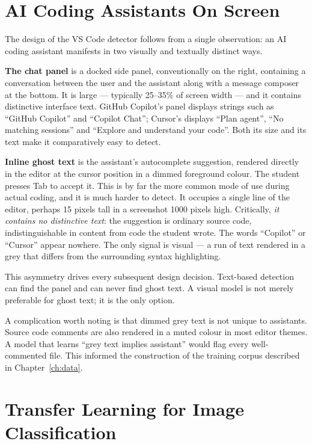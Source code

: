 \documentclass[12pt,oneside]{report}
\begin{document}
\section{AI Coding Assistants On Screen}
\label{sec:assistants}

The design of the VS Code detector follows from a single observation: an AI
coding assistant manifests in two visually and textually distinct ways.

\textbf{The chat panel} is a docked side panel, conventionally on the right,
containing a conversation between the user and the assistant along with a
message composer at the bottom. It is large --- typically 25--35\% of screen
width --- and it contains distinctive interface text. GitHub Copilot's panel
displays strings such as ``GitHub Copilot'' and ``Copilot Chat''; Cursor's
displays ``Plan agent'', ``No matching sessions'' and ``Explore and understand
your code''. Both its size and its text make it comparatively easy to detect.

\textbf{Inline ghost text} is the assistant's autocomplete suggestion, rendered
directly in the editor at the cursor position in a dimmed foreground colour.
The student presses Tab to accept it. This is by far the more common mode of
use during actual coding, and it is much harder to detect. It occupies a single
line of the editor, perhaps 15 pixels tall in a screenshot 1000 pixels high.
Critically, \emph{it contains no distinctive text}: the suggestion is ordinary
source code, indistinguishable in content from code the student wrote. The
words ``Copilot'' or ``Cursor'' appear nowhere. The only signal is visual --- a
run of text rendered in a grey that differs from the surrounding syntax
highlighting.

This asymmetry drives every subsequent design decision. Text-based detection
can find the panel and can never find ghost text. A visual model is not merely
preferable for ghost text; it is the only option.

A complication worth noting is that dimmed grey text is not unique to
assistants. Source code comments are also rendered in a muted colour in most
editor themes. A model that learns ``grey text implies assistant'' would flag
every well-commented file. This informed the construction of the training
corpus described in Chapter~\ref{ch:data}.

\section{Transfer Learning for Image Classification}
\label{sec:transfer}
\end{document}
